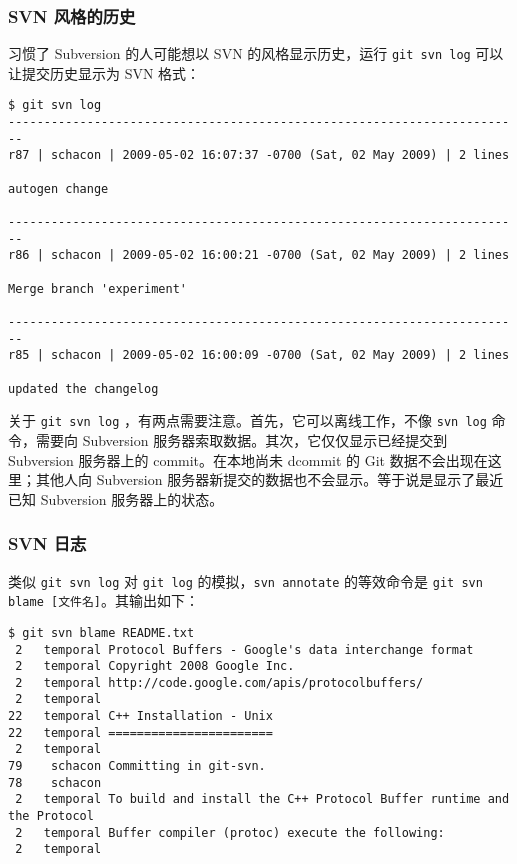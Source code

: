 \documentclass[a4paper]{book}
\begin{document}
\subsubsection{SVN 风格的历史}

习惯了 Subversion 的人可能想以 SVN 的风格显示历史，运行 \texttt{git svn log} 可以让提交历史显示为 SVN 格式：

\begin{shaded}\begin{verbatim}
$ git svn log
------------------------------------------------------------------------
r87 | schacon | 2009-05-02 16:07:37 -0700 (Sat, 02 May 2009) | 2 lines

autogen change

------------------------------------------------------------------------
r86 | schacon | 2009-05-02 16:00:21 -0700 (Sat, 02 May 2009) | 2 lines

Merge branch 'experiment'

------------------------------------------------------------------------
r85 | schacon | 2009-05-02 16:00:09 -0700 (Sat, 02 May 2009) | 2 lines

updated the changelog
\end{verbatim}\end{shaded}

关于 \texttt{git svn log} ，有两点需要注意。首先，它可以离线工作，不像 \texttt{svn log} 命令，需要向 Subversion 服务器索取数据。其次，它仅仅显示已经提交到 Subversion 服务器上的 commit。在本地尚未 dcommit 的 Git 数据不会出现在这里；其他人向 Subversion 服务器新提交的数据也不会显示。等于说是显示了最近已知 Subversion 服务器上的状态。

\subsubsection{SVN 日志}

类似 \texttt{git svn log} 对 \texttt{git log} 的模拟，\texttt{svn annotate} 的等效命令是 \texttt{git svn blame {[}文件名{]}}。其输出如下：

\begin{shaded}\begin{verbatim}
$ git svn blame README.txt 
 2   temporal Protocol Buffers - Google's data interchange format
 2   temporal Copyright 2008 Google Inc.
 2   temporal http://code.google.com/apis/protocolbuffers/
 2   temporal 
22   temporal C++ Installation - Unix
22   temporal =======================
 2   temporal 
79    schacon Committing in git-svn.
78    schacon 
 2   temporal To build and install the C++ Protocol Buffer runtime and the Protocol
 2   temporal Buffer compiler (protoc) execute the following:
 2   temporal 
\end{verbatim}\end{shaded}
\end{document}
